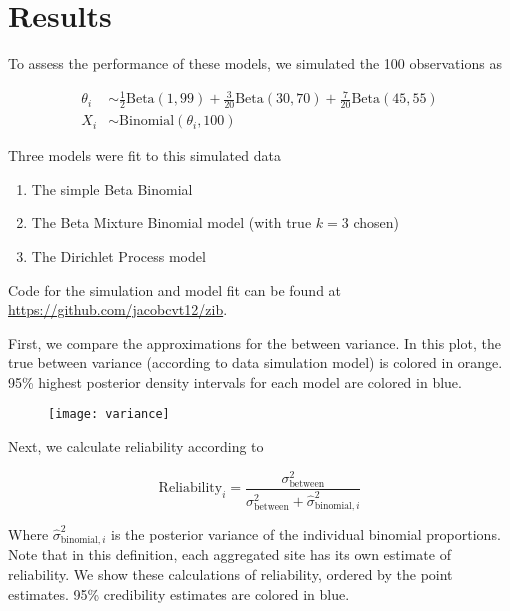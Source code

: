 \documentclass{article}
\begin{document}
\section{Results}

To assess the performance of these models, we simulated the 100 observations as

\begin{equation}\label{eq:data-sim}
    \begin{split}
    \theta_i &\sim \frac{1}{2} \text{Beta}(1, 99) + \frac{3}{20} \text{Beta}(30, 70) +\frac{7}{20} \text{Beta}(45, 55) \\
    X_i &\sim \text{Binomial}(\theta_i, 100)
    \end{split}
\end{equation}

Three models were fit to this simulated data

\begin{enumerate}[1]
    \item The simple Beta Binomial
    \item The Beta Mixture Binomial model (with true $k=3$ chosen)
    \item The Dirichlet Process model
\end{enumerate}

Code for the simulation and model fit can be found at \url{https://github.com/jacobcvt12/zib}.

First, we compare the approximations for the between variance. In this plot, the true between variance (according to data simulation model) is colored in orange. 95\% highest posterior density intervals for each model are colored in blue.

\begin{figure}[H]
\texttt{[image: variance]}
\end{figure}

Next, we calculate reliability according to~\cite{Adams2009}

\begin{equation}\label{eq:reliability}
    \text{Reliability}_i=\frac{\sigma^2_{\text{between}}}{\sigma^2_{\text{between}}+\hat{\sigma}^2_{\text{binomial},i}}
\end{equation}

Where $\hat{\sigma}^2_{\text{binomial},i}$ is the posterior variance of the individual binomial proportions. Note that in this definition, each aggregated site has its own estimate of reliability. We show these calculations of reliability, ordered by the point estimates. 95\% credibility estimates are colored in blue.
\end{document}
